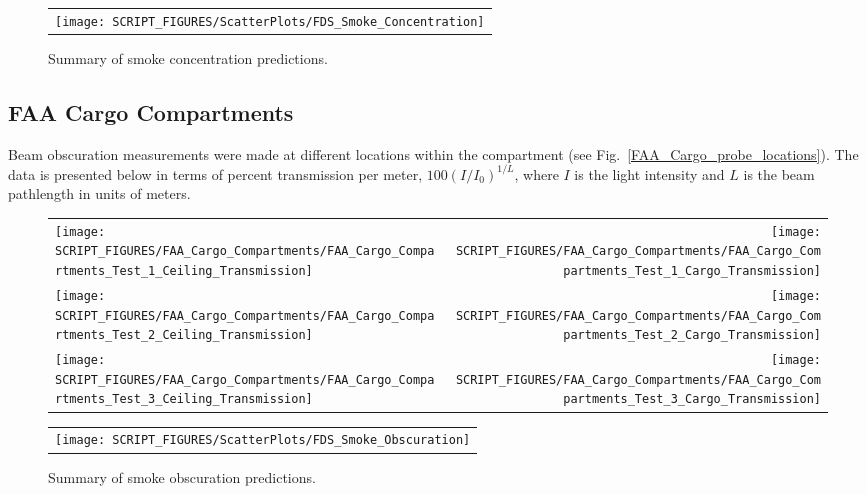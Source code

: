 \begin{figure}[p]
\begin{center}
\begin{tabular}{c}
\texttt{[image: SCRIPT\_FIGURES/ScatterPlots/FDS\_Smoke\_Concentration]}
\end{tabular}
\end{center}
\caption[Summary of smoke concentration predictions]{Summary of smoke concentration predictions.}
\end{figure}

\clearpage

\subsection{FAA Cargo Compartments}
\label{Smoke Obscuration}

Beam obscuration measurements were made at different locations within the compartment (see Fig.~\ref{FAA_Cargo_probe_locations}). The data is presented below in terms of percent transmission per meter, $100(I/I_0)^{1/L}$, where $I$ is the light intensity and $L$ is the beam pathlength in units of meters.

\begin{figure}[h]
\begin{tabular*}{\textwidth}{l@{\extracolsep{\fill}}r}
\texttt{[image: SCRIPT\_FIGURES/FAA\_Cargo\_Compartments/FAA\_Cargo\_Compartments\_Test\_1\_Ceiling\_Transmission]} &
\texttt{[image: SCRIPT\_FIGURES/FAA\_Cargo\_Compartments/FAA\_Cargo\_Compartments\_Test\_1\_Cargo\_Transmission]} \\
\texttt{[image: SCRIPT\_FIGURES/FAA\_Cargo\_Compartments/FAA\_Cargo\_Compartments\_Test\_2\_Ceiling\_Transmission]} &
\texttt{[image: SCRIPT\_FIGURES/FAA\_Cargo\_Compartments/FAA\_Cargo\_Compartments\_Test\_2\_Cargo\_Transmission]} \\
\texttt{[image: SCRIPT\_FIGURES/FAA\_Cargo\_Compartments/FAA\_Cargo\_Compartments\_Test\_3\_Ceiling\_Transmission]} &
\texttt{[image: SCRIPT\_FIGURES/FAA\_Cargo\_Compartments/FAA\_Cargo\_Compartments\_Test\_3\_Cargo\_Transmission]}
\end{tabular*}
\end{figure}

\newpage

\begin{figure}[p]
\begin{center}
\begin{tabular}{c}
\texttt{[image: SCRIPT\_FIGURES/ScatterPlots/FDS\_Smoke\_Obscuration]}
\end{tabular}
\end{center}
\caption[Summary of smoke obscuration predictions]{Summary of smoke obscuration predictions.}
\end{figure}


